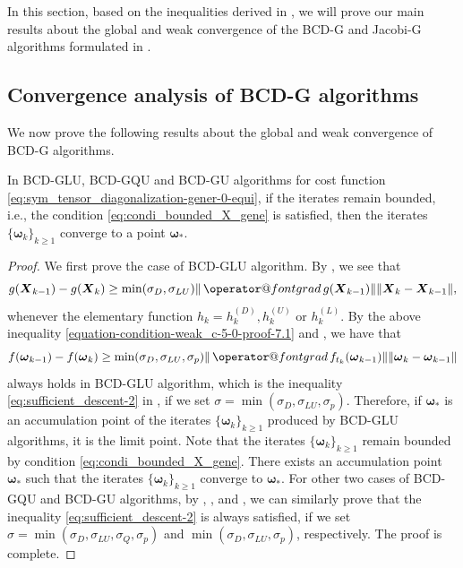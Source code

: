\documentclass[final,onefignum,onetabnum]{siamart190516}
\makeatletter
\newcommand{\matr}[1]{\boldsymbol{#1}}
\newcommand{\ProjGrad}[2]{\mathop{{\operator@font grad} }#1(#2)}
\makeatother
\begin{document}
In this section, based on the inequalities derived in , we will prove our main results about the global and weak convergence of the BCD-G and Jacobi-G algorithms formulated in . 

\subsection{Convergence analysis of BCD-G algorithms}\label{subsec:convergence_BCD-GLU}

We now prove the following results about the global and weak convergence of BCD-G algorithms. 

\begin{theorem}\label{theorem_main_global_conv}
In BCD-GLU, BCD-GQU and BCD-GU algorithms for cost function \cref{eq:sym_tensor_diagonalization-gener-0-equi},
if the iterates remain bounded, i.e., the condition \cref{eq:condi_bounded_X_gene} is satisfied, 
then the iterates $\{\matr{\omega}_k\}_{k\geq 1}$ converge to a point $\matr{\omega}_{*}$.
\end{theorem}

\begin{proof}
We first prove the case of BCD-GLU algorithm. 
By , we see that  
\begin{equation}\label{equation-condition-weak_c-5-0-proof-7.1}
g(\matr{X}_{k-1})-g(\matr{X}_{k})\geq\min(\sigma_{D},\sigma_{LU})\|\ProjGrad{g}{\matr{X}_{k-1}}\|\|\matr{X}_{k}-\matr{X}_{k-1}\|,
\end{equation}
whenever the elementary function $h_k=h^{(D)}_{k}, h^{(U)}_{k}$ or $h^{(L)}_k$. 
By the above inequality \cref{equation-condition-weak_c-5-0-proof-7.1} and , we have that 
\begin{equation}\label{eq:sufficient_descent-2-proof-6.11}
f(\matr{\omega}_{k-1})-f(\matr{\omega}_{k})\geq\min(\sigma_{D},\sigma_{LU},\sigma_{p})\|\ProjGrad{f_{t_k}}{\matr{\omega}_{k-1}}\|\|\matr{\omega}_{k}-\matr{\omega}_{k-1}\|
\end{equation}
always holds in BCD-GLU algorithm, which is the inequality \cref{eq:sufficient_descent-2} in , if we set $\sigma=\min(\sigma_{D},\sigma_{LU},\sigma_{p})$. 
Therefore, if $\matr{\omega}_*$ is an accumulation point of the iterates $\{\matr{\omega}_k\}_{k\geq 1}$ produced by BCD-GLU algorithms, it is the limit point.
Note that the iterates  $\{\matr{\omega}_k\}_{k\geq 1}$ remain bounded by condition \cref{eq:condi_bounded_X_gene}. There exists an accumulation point $\matr{\omega}_*$ such that the iterates $\{\matr{\omega}_k\}_{k\geq 1}$ converge to $\matr{\omega}_{*}$. 
For other two cases of BCD-GQU and BCD-GU algorithms, by , ,  and , we can similarly prove that the inequality \cref{eq:sufficient_descent-2} is always satisfied, if we set $\sigma=\min(\sigma_{D},\sigma_{LU},\sigma_{Q},\sigma_{p})$ and $\min(\sigma_{D},\sigma_{LU},\sigma_{p})$, respectively.  
The proof is complete. 
\end{proof}
\end{document}
